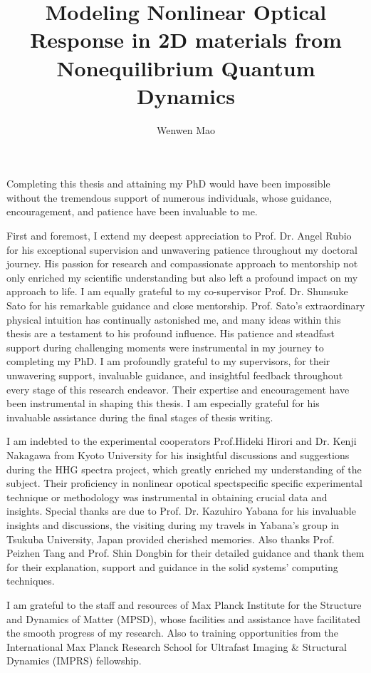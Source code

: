 \documentclass[a4paper, twoside]{NUSThesis}
\title{Modeling Nonlinear Optical Response in 2D materials from Nonequilibrium Quantum Dynamics}
\author{Wenwen Mao}
\begin{document}
\maketitle
\makedeclaration
\frontmatter

\begin{acknowledgments}

	Completing this thesis and attaining my PhD would have been impossible without the tremendous support of numerous individuals, whose guidance, encouragement, and patience have been invaluable to me.

	First and foremost, I extend my deepest appreciation to Prof. Dr. Angel Rubio for his exceptional supervision and unwavering patience throughout my doctoral journey. His passion for research and compassionate approach to mentorship not only enriched my scientific understanding but also left a profound impact on my approach to life.
	I am equally grateful to my co-supervisor Prof. Dr. Shunsuke Sato for his remarkable guidance and close mentorship. Prof. Sato's extraordinary physical intuition has continually astonished me, and many ideas within this thesis are a testament to his profound influence. His patience and steadfast support during challenging moments were instrumental in my journey to completing my PhD. I am profoundly grateful to my supervisors, for their unwavering support, invaluable guidance, and insightful feedback throughout every stage of this research endeavor. Their expertise and encouragement have been instrumental in shaping this thesis. I am especially grateful for his invaluable assistance during the final stages of thesis writing.

	I am indebted to the experimental cooperators Prof.Hideki Hirori and Dr. Kenji Nakagawa from Kyoto University for his insightful discussions and suggestions during the HHG spectra project, which greatly enriched my understanding of the subject. Their proficiency in nonlinear opotical spectspecific specific experimental technique or methodology was instrumental in obtaining crucial data and insights. Special thanks are due to Prof. Dr. Kazuhiro Yabana for his invaluable insights and discussions, the visiting during my travels in Yabana's group in Tsukuba University, Japan provided cherished memories. Also thanks Prof. Peizhen Tang and Prof. Shin Dongbin for their detailed guidance and thank them for their explanation, support and guidance in the solid systems' computing techniques.

	I am grateful to the staff and resources of Max Planck Institute for the Structure and Dynamics of Matter (MPSD), whose facilities and assistance have facilitated the smooth progress of my research. Also to training opportunities from the International Max Planck Research School for Ultrafast Imaging \& Structural Dynamics (IMPRS) fellowship.


\end{acknowledgments}
\end{document}
